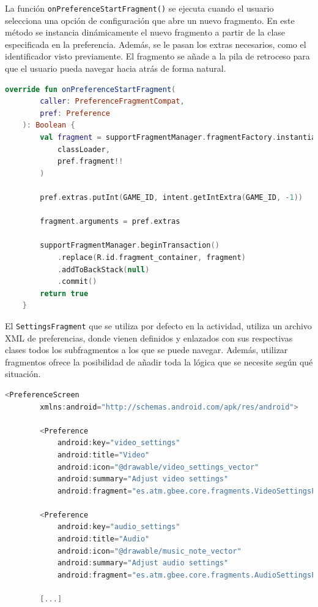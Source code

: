 La función \texttt{onPreferenceStartFragment()} se ejecuta cuando el usuario selecciona una opción de configuración que abre un nuevo fragmento. En este método se instancia dinámicamente el nuevo fragmento a partir de la clase especificada en la preferencia. Además, se le pasan los extras necesarios, como el identificador visto previamente. El fragmento se añade a la pila de retroceso para que el usuario pueda navegar hacia atrás de forma natural.

\begin{lstlisting}[language=Kotlin, caption={SettingsActivity - Selección de Otro Fragmento.}, label={code:settingsActivitySelect}]
    override fun onPreferenceStartFragment(
        caller: PreferenceFragmentCompat,
        pref: Preference
    ): Boolean {
        val fragment = supportFragmentManager.fragmentFactory.instantiate(
            classLoader,
            pref.fragment!!
        )

        pref.extras.putInt(GAME_ID, intent.getIntExtra(GAME_ID, -1))

        fragment.arguments = pref.extras

        supportFragmentManager.beginTransaction()
            .replace(R.id.fragment_container, fragment)
            .addToBackStack(null)
            .commit()
        return true
    }
\end{lstlisting}

El \texttt{SettingsFragment} que se utiliza por defecto en la actividad, utiliza un archivo XML de preferencias, donde vienen definidos y enlazados con sus respectivas clases todos los subfragmentos a los que se puede navegar. Además, utilizar fragmentos ofrece la posibilidad de añadir toda la lógica que se necesite según qué situación.

\begin{lstlisting}[language=Kotlin, caption={SettingsActivity - Archivo de Preferencias.}, label={code:settingsActivityPreferences}]
    <PreferenceScreen
        xmlns:android="http://schemas.android.com/apk/res/android">

        <Preference
            android:key="video_settings"
            android:title="Video"
            android:icon="@drawable/video_settings_vector"
            android:summary="Adjust video settings"
            android:fragment="es.atm.gbee.core.fragments.VideoSettingsFragment" />

        <Preference
            android:key="audio_settings"
            android:title="Audio"
            android:icon="@drawable/music_note_vector"
            android:summary="Adjust audio settings"
            android:fragment="es.atm.gbee.core.fragments.AudioSettingsFragment" />

        [...]
\end{lstlisting}

